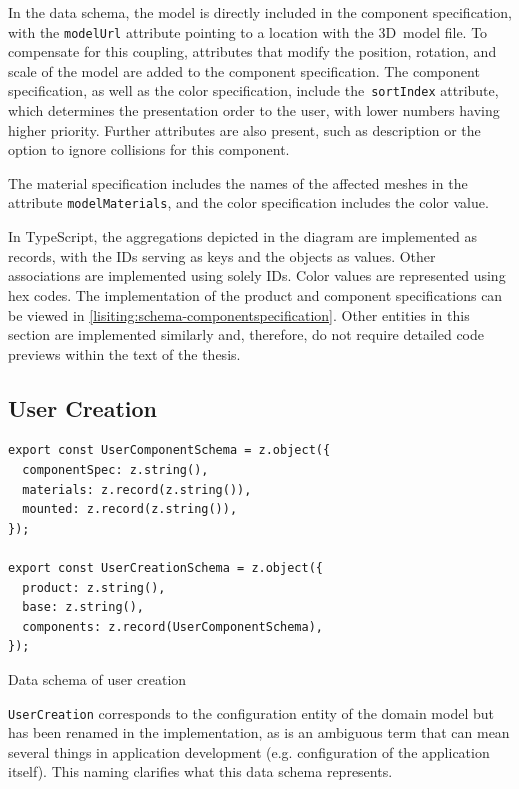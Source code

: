 In the data schema, the model is directly included in the component specification, with the \texttt{modelUrl} attribute pointing to a location with the 3D~model file. To compensate for this coupling, attributes that modify the position, rotation, and scale of the model are added to the component specification. The component specification, as well as the color specification, include the~\texttt{sortIndex} attribute, which determines the presentation order to the user, with lower numbers having higher priority. Further attributes are also present, such as description or the option to ignore collisions for this component.

The material specification includes the names of the affected meshes in the attribute \texttt{modelMaterials}, and the color specification includes the color value.

In TypeScript, the aggregations depicted in the  diagram are implemented as records, with the IDs serving as keys and the objects as values. Other associations are implemented using solely IDs. Color values are represented using hex codes. The implementation of the product and component specifications can be viewed in \autoref{lisiting:schema-componentspecification}. Other entities in this section are implemented similarly and, therefore, do not require detailed code previews within the text of the thesis.


\subsection{User Creation}

\begin{listing}[h]
\begin{verbatim}
export const UserComponentSchema = z.object({
  componentSpec: z.string(),
  materials: z.record(z.string()),
  mounted: z.record(z.string()),
});

export const UserCreationSchema = z.object({
  product: z.string(),
  base: z.string(),
  components: z.record(UserComponentSchema),
});
\end{verbatim}
\caption{Data schema of user creation}
\label{lisiting:schema-usercreation}
\end{listing}

\texttt{UserCreation} corresponds to the configuration entity of the domain model but has been renamed in the implementation, as  is an ambiguous term that can mean several things in application development (e.g. configuration of the application itself). This naming clarifies what this data schema represents.

